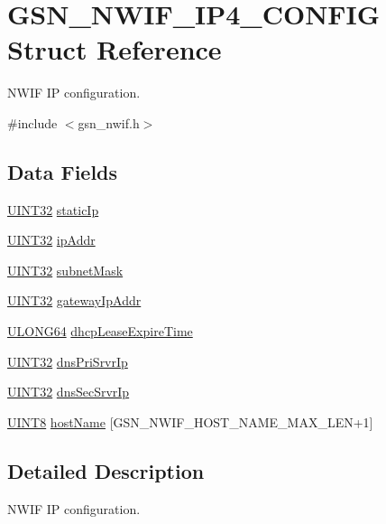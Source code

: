 \hypertarget{a00170}{
\section{GSN\_\-NWIF\_\-IP4\_\-CONFIG Struct Reference}
\label{a00170}
}


NWIF IP configuration.  




{\ttfamily \#include $<$gsn\_\-nwif.h$>$}

\subsection*{Data Fields}
\begin{DoxyCompactItemize}
\item 
\hyperlink{a00660_gae1e6edbbc26d6fbc71a90190d0266018}{UINT32} \hyperlink{a00170_a3645e8aceeda8be734506deae9b16aae}{staticIp}
\item 
\hyperlink{a00660_gae1e6edbbc26d6fbc71a90190d0266018}{UINT32} \hyperlink{a00170_a48e99cad0feadbd616a0cda7d9628826}{ipAddr}
\item 
\hyperlink{a00660_gae1e6edbbc26d6fbc71a90190d0266018}{UINT32} \hyperlink{a00170_a57e84f1cb54cb270925550e459768abe}{subnetMask}
\item 
\hyperlink{a00660_gae1e6edbbc26d6fbc71a90190d0266018}{UINT32} \hyperlink{a00170_acce916feccd51bb2f497d83520f0dead}{gatewayIpAddr}
\item 
\hyperlink{a00660_ga28961430434ccabca6862ea93fe9a15b}{ULONG64} \hyperlink{a00170_a89875aaf4ec4e96b54d0f7a14423861f}{dhcpLeaseExpireTime}
\item 
\hyperlink{a00660_gae1e6edbbc26d6fbc71a90190d0266018}{UINT32} \hyperlink{a00170_a2e8867f6d4eeb9ec8e4e1f60b62256a6}{dnsPriSrvrIp}
\item 
\hyperlink{a00660_gae1e6edbbc26d6fbc71a90190d0266018}{UINT32} \hyperlink{a00170_a671649f6f19fe92fefced076678b08ac}{dnsSecSrvrIp}
\item 
\hyperlink{a00660_gab27e9918b538ce9d8ca692479b375b6a}{UINT8} \hyperlink{a00170_a0379c17037072ed631bd2efd42722f2c}{hostName} \mbox{[}GSN\_\-NWIF\_\-HOST\_\-NAME\_\-MAX\_\-LEN+1\mbox{]}
\end{DoxyCompactItemize}


\subsection{Detailed Description}
NWIF IP configuration. 

